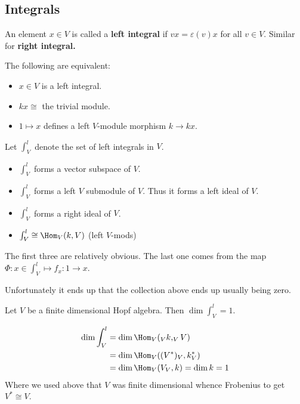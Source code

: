 \documentclass[12pt]{article}
\begin{document}
\subsection{Integrals}
\begin{defn}
	An element $x\in V$ is called a \textbf{left integral} if $vx=\varepsilon(v)x$ for all $v\in V$.
	Similar for \textbf{right integral.}
\end{defn}
\begin{lem}
	The following are equivalent:
	\begin{itemize}
		\item $x\in V$ is a left integral.
		\item $kx\cong$ the trivial module.
		\item $1\mapsto x$ defines a left $V$-module morphism $k\to kx$.
	\end{itemize}
\end{lem}
\begin{lem}
	Let $\int_V^l$ denote the set of left integrals in $V$.
	\begin{itemize}
		\item $\int_V^l$ forms a vector subspace of $V$.
		\item $\int_V^l$ forms a left $V$ submodule of $V$. Thus it forms a left ideal of $V$.
		\item $\int_V^l$ forms a right ideal of $V$.
		\item $\int_V^l\cong\Hom_V(k,V)$ (left $V$-mods)
	\end{itemize}
\end{lem}
\begin{prf}
	The first three are relatively obvious. The last one comes from the map $\Phi:x\in\int_V^l\mapsto f_x:1\to x.$
\end{prf}
\begin{rmk}
	Unfortunately it ends up that the collection above ends up usually being zero. 
\end{rmk}
\begin{thm}
	Let $V$ be a finite dimensional Hopf algebra. Then $\dim\int_V^l=1$.
\end{thm}
\begin{prf}
	\begin{align*}
		\dim\int_V^l&= \dim\Hom_V(_Vk,_VV)\\
		&=\dim\Hom_V((V^*)_V,k_V^*)\\
		&=\dim\Hom_V(V_V,k)=\dim k=1
	\end{align*}
	Where we used above that $V$ was finite dimensional whence Frobenius to get $V^*\cong V$.
\end{prf}
\end{document}
